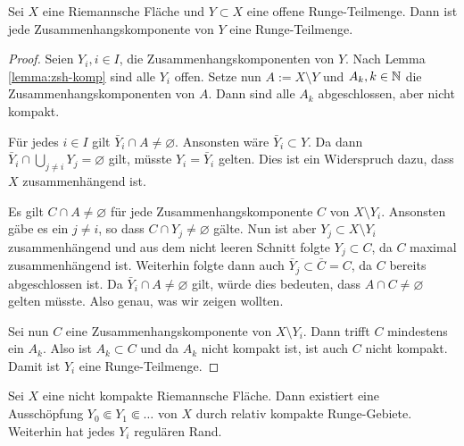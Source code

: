 \begin{thm}
  \label{thm:runge-zshkomp}
  Sei $X$ eine Riemannsche Fläche und $Y \subset X$ eine offene
  Runge-Teilmenge. Dann ist jede Zusammenhangskomponente von $Y$ eine
  Runge-Teilmenge. 
\end{thm}

\begin{proof}
  Seien $Y_i, i \in I$, die Zusammenhangskomponenten von
  $Y$. Nach Lemma \ref{lemma:zsh-komp} sind alle $Y_i$ offen.
  Setze nun $A := X \setminus Y$ und $A_k, k\in \mathbb{N}$ die
  Zusammenhangskomponenten von $A$. Dann sind alle $A_k$
  abgeschlossen, aber nicht kompakt.
  
  Für jedes $i \in I$ gilt $\bar Y_i \cap A \neq
  \varnothing$. 
  Ansonsten wäre $\bar Y_i \subset Y$. Da dann $\bar Y_i \cap \bigcup_{j
    \neq i} Y_j = \varnothing$ gilt, müsste $Y_i = \bar Y_i$ gelten. Dies
  ist ein Widerspruch dazu, dass $X$ zusammenhängend ist.
  
  Es gilt $C \cap A \neq \varnothing$ für jede
  Zusammenhangskomponente $C$ von $X \setminus Y_i$. 
  Ansonsten gäbe es ein $j \neq i$, so dass $C \cap Y_j \neq
  \varnothing$ gälte.
  Nun ist aber $Y_j \subset X \setminus Y_i$ zusammenhängend und aus
  dem nicht leeren Schnitt folgte $Y_j \subset C$, da $C$ maximal
  zusammenhängend ist. Weiterhin folgte dann auch $\bar Y_j \subset
  \bar C = C$, da $C$ bereits abgeschlossen ist. Da $\bar Y_i \cap A
  \neq \varnothing$ gilt,  würde dies
  bedeuten, dass $A \cap C \neq \varnothing$ gelten müsste. Also
  genau, was wir zeigen wollten.
  
  Sei nun $C$ eine Zusammenhangskomponente von $X \setminus
  Y_i$. Dann trifft $C$ mindestens ein $A_k$. Also ist $A_k
  \subset C$ und da $A_k$ nicht kompakt ist, ist auch $C$ nicht kompakt.
  Damit ist $Y_i$ eine Runge-Teilmenge.
\end{proof}

\begin{thm}
  \label{thm:Ausschöpfung-Runge}
  Sei $X$ eine nicht kompakte Riemannsche Fläche. Dann existiert eine
  Ausschöpfung $Y_0 \Subset Y_1 \Subset \dots$ von $X$ durch relativ
  kompakte Runge-Gebiete. Weiterhin hat jedes $Y_i$ regulären Rand.
\end{thm}


